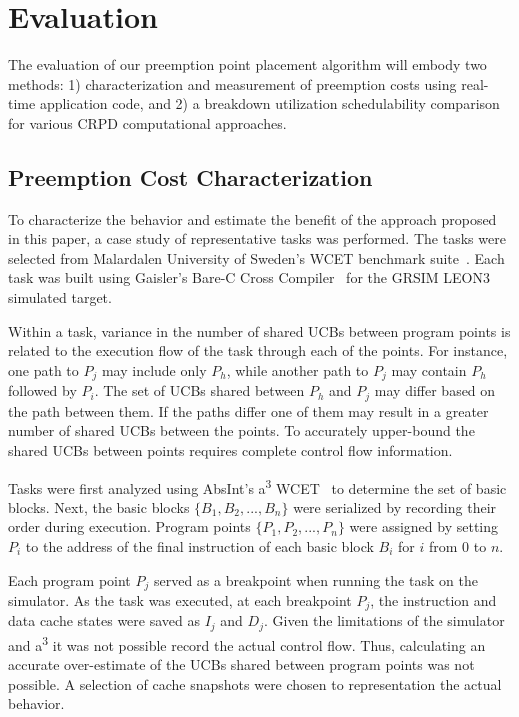 \section{Evaluation}\label{sec:evaluation}

The evaluation of our preemption point placement algorithm will embody
two methods: 1) characterization and measurement of preemption costs
using real-time application code, and 2) a breakdown utilization schedulability
comparison for various CRPD computational approaches.

\subsection {Preemption Cost
  Characterization}\label{sec:preemption_cost_measurement}
To characterize the behavior and estimate the benefit of the approach
proposed in this paper, a case study of representative tasks was
performed. The tasks were selected from Malardalen University of
Sweden's WCET benchmark suite~\cite{mrtc:01}. Each task was built using Gaisler's
Bare-C Cross Compiler~\cite{gaisler:01} for the GRSIM
LEON3~\cite{gaisler:02} simulated target.

Within a task, variance in the number of shared UCBs between program
points is related to the execution flow of the task through each of
the points. For instance, one path to ${P_j}$ may include only ${P_h}$,
while another path to ${P_j}$ may contain ${P_h}$ followed by
${P_i}$. The set of UCBs shared between ${P_h}$ and ${P_j}$ may differ
based on the path between them. If the paths differ one of them may
result in a greater number of shared UCBs between the points. To
accurately upper-bound the shared UCBs between points requires
complete control flow information.

Tasks were first analyzed using AbsInt's a\textsuperscript{3} WCET~\cite{absint:01}
to determine the set of basic blocks. Next, the basic
blocks ${\{B_1, B_2, ..., B_n\}}$ were serialized by recording their
order during execution. Program points ${\{P_1, P_2, ..., P_n\}}$ were
assigned by setting ${P_i}$ to the address of the final instruction of
each basic block ${B_i}$ for ${i}$ from ${0}$ to ${n}$.

Each program point ${P_j}$ served as a breakpoint when running the
task on the simulator. As the task was executed, at each breakpoint
${P_j}$, the instruction and data cache states were saved as ${I_j}$
and ${D_j}$. Given the limitations of the simulator and
a\textsuperscript{3} it was not possible record the actual control
flow. Thus, calculating an accurate over-estimate of the UCBs shared
between program points was not possible. A selection of cache
snapshots were chosen to representation the actual behavior.

